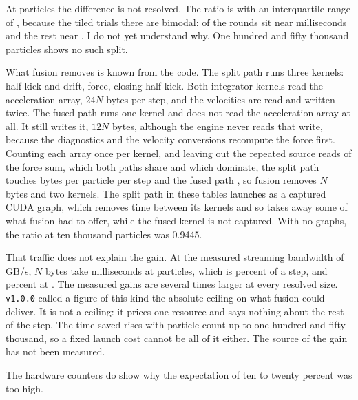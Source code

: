 At \LadderMaxN{} particles the difference is not resolved. The ratio is
\FusedOverTiledRatioAtMaxN{} with an interquartile range of
\FusedOverTiledRatioIqrAtMaxN{}, because the tiled trials there are bimodal:
\TiledHighModeRoundsAtMaxN{} of the \PairedRoundsAtMaxN{} rounds sit near
\TiledHighModeMsAtMaxN{} milliseconds and the rest near \TiledLowModeMsAtMaxN{}. I do
not yet understand why. One hundred and fifty thousand particles shows no such split.

What fusion removes is known from the code. The split path runs three kernels: half
kick and drift, force, closing half kick. Both integrator kernels read the
acceleration array, $24N$ bytes per step, and the velocities are read and written
twice. The fused path runs one kernel and does not read the acceleration array at
all. It still writes it, $12N$ bytes, although the engine never reads that write,
because the diagnostics and the velocity conversions recompute the force first.
Counting each array once per kernel, and leaving out the repeated source reads of the
force sum, which both paths share and which dominate, the split path touches
\ModelBytesPerParticleSplit{} bytes per particle per step and the fused path
\ModelBytesPerParticleFused{}, so fusion removes \ModelBytesPerParticleSaved{}$N$ bytes
and two kernels. The split path in these tables launches as a captured CUDA graph, which
removes time between its kernels and so takes away some of what fusion had to offer, while
the fused kernel is not captured. With no graphs, the ratio at ten thousand particles was
0.9445.

That traffic does not explain the gain. At the measured streaming bandwidth of
\GpuMeasuredBandwidth{} GB/s, \ModelBytesPerParticleSaved{}$N$ bytes take
\ModelSavingMsAtMaxN{} milliseconds at \LadderMaxN{} particles, which is
\ModelSavingPercentAtMaxN{} percent of a step, and \ModelSavingPercentAtMinN{} percent
at \LadderMinN{}. The measured gains are several times larger at every resolved size.
\texttt{v1.0.0} called a figure of this kind the absolute ceiling on what fusion could
deliver. It is not a ceiling: it prices one resource and says nothing about the rest
of the step. The time saved rises with particle count up to one hundred and fifty
thousand, so a fixed launch cost cannot be all of it either. The source of the gain
has not been measured.

The hardware counters do show why the expectation of ten to twenty percent was too
high.

\begin{table}[htbp]
  \centering
  
  \caption{Nsight Compute counters for one launch at \ProfileParticles{} particles.
  Device memory throughput is below one percent of peak for every variant.}
  \label{tab:counters}
\end{table}

